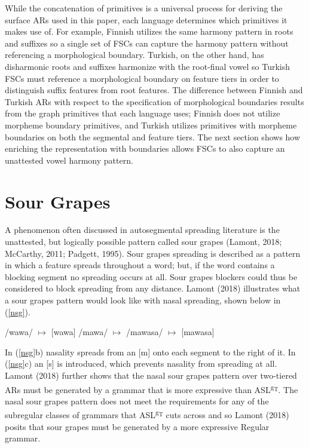 \documentclass[,doc,floatsintext]{apa6}
\theoremstyle{definition}
\theoremstyle{definition}
\theoremstyle{definition}
\theoremstyle{remark}
\begin{document}
While the concatenation of primitives is a universal process for
deriving the surface ARs used in this paper, each language determines
which primitives it makes use of. For example, Finnish utilizes the same
harmony pattern in roots and suffixes so a single set of FSCs can
capture the harmony pattern without referencing a morphological
boundary. Turkish, on the other hand, has disharmonic roots and suffixes
harmonize with the root-final vowel so Turkish FSCs must reference a
morphological boundary on feature tiers in order to distinguish suffix
features from root features. The difference between Finnish and Turkish
ARs with respect to the specification of morphological boundaries
results from the graph primitives that each language uses; Finnish does
not utilize morpheme boundary primitives, and Turkish utilizes
primitives with morpheme boundaries on both the segmental and feature
tiers. The next section shows how enriching the representation with
boundaries allows FSCs to also capture an unattested vowel harmony
pattern.

\section{Sour Grapes}\label{sour-grapes}

A phenomenon often discussed in autosegmental spreading literature is
the unattested, but logically possible pattern called sour grapes
(Lamont, 2018; McCarthy, 2011; Padgett, 1995). Sour grapes spreading is
described as a pattern in which a feature spreads throughout a word;
but, if the word contains a blocking segment no spreading occurs at all.
Sour grapes blockers could thus be considered to block spreading from
any distance. Lamont (2018) illustrates what a sour grapes pattern would
look like with nasal spreading, shown below in (\ref{nsg}).

\begin{exe}
\label{nsg}
\begin{xlist}
  \ex /wawa/ $\mapsto$ [wawa]
  \ex /mawa/ $\mapsto$ \textipa{[m\~a\~w\~a]}
  \ex /mawasa/ $\mapsto$ [mawasa]
\end{xlist}
\end{exe}

\noindent In (\ref{nsg}b) nasality spreads from an {[}m{]} onto each
segment to the right of it. In (\ref{nsg}c) an {[}s{]} is introduced,
which prevents nasality from spreading at all. Lamont (2018) further
shows that the nasal sour grapes pattern over two-tiered ARs must be
generated by a grammar that is more expressive than
ASL\textsuperscript{g\textsubscript{T}}. The nasal sour grapes pattern
does not meet the requirements for any of the subregular classes of
grammars that ASL\textsuperscript{g\textsubscript{T}} cuts across and so
Lamont (2018) posits that sour grapes must be generated by a more
expressive Regular grammar.
\end{document}
